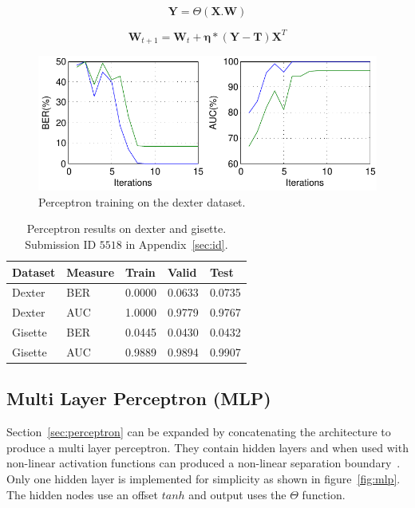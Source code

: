 \documentclass{ecsarticle}     %
\begin{document}
\begin{equation}
   \textbf{Y} = \Theta ( \textbf{X}.\textbf{W})
   \label{eqn:slp_mat}
\end{equation}

\begin{equation}	
	\textbf{W}_{t+1} = \textbf{W}_t + \mathbf{\eta}*(\mathbf{Y}-\mathbf{T})\mathbf{X}^T
	\label{eqn:slp_learn}
\end{equation}


\begin{figure}[ht]
   \centering
    \includegraphics[width = 14cm]{SLP_train.pdf}
   \caption{Perceptron training on the dexter dataset.}
   \label{fig:slp_train}
\end{figure}


\begin{table}[h]
	\centering
	\begin{tabular}{|l|l|l|l|l|} \hline
     	\textbf{Dataset}	& \textbf{Measure}	& \textbf{Train} & \textbf{Valid} & \textbf{Test} \\ \hline	
		Dexter & BER & 0.0000 & 0.0633 & 0.0735 \\ \hline
		Dexter & AUC & 1.0000 & 0.9779 & 0.9767 \\ \hline
		Gisette & BER & 0.0445 & 0.0430 & 0.0432 \\ \hline
		Gisette & AUC & 0.9889 & 0.9894 & 0.9907 \\ \hline
	\end{tabular}
	\caption{Perceptron results on dexter and gisette. Submission ID $5518$ in Appendix~\ref{sec:id}.}
	\label{tab:slp_test}
\end{table}






\subsection{Multi Layer Perceptron (MLP)}
Section~\ref{sec:perceptron} can be expanded by concatenating the architecture to produce a multi layer perceptron.
They contain hidden layers and when used with non-linear activation functions can produced a non-linear separation boundary~\citep{bennett01ml}.
Only one hidden layer is implemented for simplicity as shown in figure~\ref{fig:mlp}.
The hidden nodes use an offset $tanh$ and output uses the $\Theta$ function.
\end{document}
